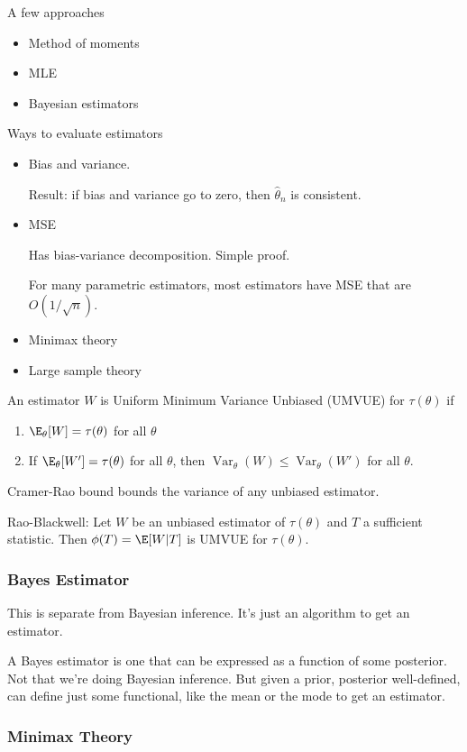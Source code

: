 \documentclass[12pt]{article}
\theoremstyle{plain}
\theoremstyle{definition}
\theoremstyle{remark}
\newcommand{\Var}{\operatorname{Var}}
\begin{document}
A few approaches
\begin{itemize}
  \item Method of moments
  \item MLE
  \item Bayesian estimators
\end{itemize}
Ways to evaluate estimators
\begin{itemize}
  \item Bias and variance.

    Result: if bias and variance go to zero, then $\hat{\theta}_n$ is
    consistent.

  \item MSE

    Has bias-variance decomposition.
    Simple proof.

    For many parametric estimators, most estimators have MSE that are
    $O(1/\sqrt{n})$.

  \item Minimax theory
  \item Large sample theory
\end{itemize}
An estimator $W$ is Uniform Minimum Variance Unbiased (UMVUE) for
$\tau(\theta)$ if
\begin{enumerate}
  \item $\E_\theta[W]=\tau(\theta)$ for all $\theta$
  \item If $\E_\theta[W']=\tau(\theta)$ for all $\theta$, then
    $\Var_\theta(W)\leq \Var_\theta(W')$ for all $\theta$.
\end{enumerate}
Cramer-Rao bound bounds the variance of any unbiased estimator.

Rao-Blackwell:
Let $W$ be an unbiased estimator of $\tau(\theta)$ and $T$ a sufficient
statistic.
Then $\phi(T)=\E[W|T]$ is UMVUE for $\tau(\theta)$.



\subsubsection{Bayes Estimator}

This is separate from Bayesian inference. It's just an algorithm to get
an estimator.

A Bayes estimator is one that can be expressed as a function of some
posterior.
Not that we're doing Bayesian inference.
But given a prior, posterior well-defined, can define just some
functional, like the mean or the mode to get an estimator.


\subsubsection{Minimax Theory}
\end{document}
